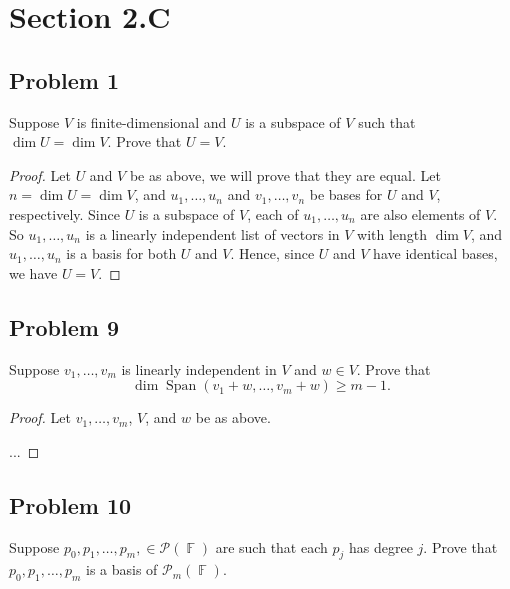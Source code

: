 \documentclass[letterpaper, 12pt]{amsart}
\DeclareMathOperator{\F}{\mathbb{F}}				%
\DeclareMathOperator{\Span}{Span}					%
\theoremstyle{definition}  							%
\begin{document}
	\section*{Section 2.C}
		\subsection*{Problem 1}
		Suppose $V$ is finite-dimensional and $U$ is a subspace of $V$ such that $\dim U = \dim V$. 
		Prove that $U = V$.

		\begin{proof}
		Let $U$ and $V$ be as above, we will prove that they are equal.
		Let $n = \dim U = \dim V$, and $u_{1}, \dots, u_{n}$ and $v_{1}, \dots, v_{n}$ be bases for $U$ and $V$, respectively.
		Since $U$ is a subspace of $V$, each of $u_{1}, \dots, u_{n}$ are also elements of $V$.
		So $u_{1}, \dots, u_{n}$ is a linearly independent list of vectors in $V$ with length $\dim V$, and $u_{1}, \dots, u_{n}$ is a basis for both $U$ and $V$.
		Hence, since $U$ and $V$ have identical bases, we have $U = V$.
		\end{proof}

		\subsection*{Problem 9}
		Suppose $v_{1}, \dots, v_{m}$ is linearly independent in $V$ and $w \in V$. 
		Prove that $$\dim \Span(v_{1} + w, \dots, v_{m} + w) \geq m-1.$$

		\begin{proof}
		Let $v_{1}, \dots, v_{m}$, $V$, and $w$ be as above.

		...
		\end{proof}

		\subsection*{Problem 10}
		Suppose $p_{0}, p_{1}, \dots, p_{m}, \in \mathcal{P}(\F)$ are such that each $p_{j}$ has degree $j$. 
		Prove that $p_{0}, p_{1}, \dots, p_{m}$ is a basis of $\mathcal{P}_{m}(\F)$.
\end{document}
